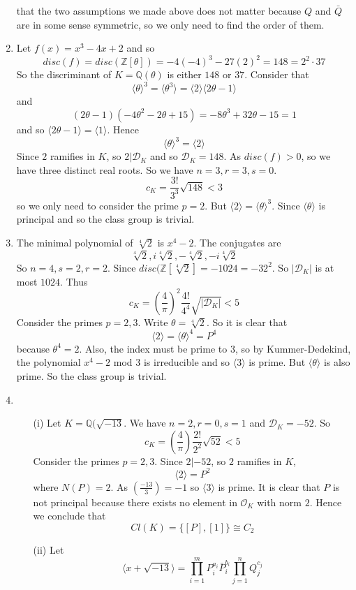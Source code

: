 \begin{enumerate}
that the two assumptions we made above does not matter because $Q$ and $\bar{Q}$ are in some sense symmetric,
so we only need to find the order of them.\\
\item Let $f(x)=x^3-4x+2$ and so
$$disc(f)=disc(\mathbb{Z}[\theta])=-4(-4)^3-27(2)^2=148=2^2\cdot 37$$
So the discriminant of $K=\mathbb{Q}(\theta)$ is either $148$ or $37$.
Consider that
$$\langle \theta \rangle^3=\langle \theta^3 \rangle=\langle 2 \rangle \langle 2\theta-1 \rangle$$
and
$$(2\theta-1)(-4\theta^2-2\theta+15)=-8\theta^3+32\theta-15=1$$
and so $\langle 2\theta-1 \rangle=\langle 1 \rangle$. Hence
$$\langle \theta \rangle^3=\langle 2 \rangle$$
Since $2$ ramifies in $K$, so $2|\mathcal{D}_K$ and so $\mathcal{D}_K=148$.
As $disc(f)>0$, so we have three distinct real roots. So we have $n=3,r=3,s=0$.
$$c_K=\frac{3!}{3^3}\sqrt{148}<3$$
so we only need to consider the prime $p=2$.
But $\langle 2 \rangle=\langle \theta \rangle^3$. Since $\langle \theta \rangle$ is principal and so the class group is trivial.\\
\item
The minimal polynomial of $\sqrt[4]{2}$ is $x^4-2$. The conjugates are
$$\sqrt[4]{2},i\sqrt[4]{2},-\sqrt[4]{2},-i\sqrt[4]{2}$$
So $n=4,s=2,r=2$. Since $disc(\mathbb{Z}[\sqrt[4]{2}]=-1024=-32^2$.
So $|\mathcal{D}_K|$ is at most $1024$. Thus
$$c_K=\left(\frac{4}{\pi}\right)^2 \frac{4!}{4^4}\sqrt{|\mathcal{D}_K|} <5$$
Consider the primes $p=2,3$. Write $\theta=\sqrt[4]{2}$. So it is clear that
$$\langle 2 \rangle=\langle \theta \rangle^4=P^4$$
because $\theta^4=2$. Also, the index must be prime to $3$, so by Kummer-Dedekind, the polynomial
$x^4-2$ mod $3$ is irreducible and so $\langle 3 \rangle$ is prime.
But $\langle \theta \rangle$ is also prime. So the class group is trivial.
\item
\begin{enumerate}
\item[(i)] Let $K=\mathbb{Q}(\sqrt{-13}$. We have $n=2,r=0,s=1$ and $\mathcal{D}_K=-52$. So
$$c_K=\left(\frac{4}{\pi}\right) \frac{2!}{2^2}\sqrt{52}<5$$
Consider the primes $p=2,3$. Since $2|-52$, so $2$ ramifies in $K$,
$$\langle 2 \rangle=P^2$$
where $N(P)=2$. As $(\frac{-13}{3})=-1$ so $\langle 3 \rangle$ is prime. It is clear that $P$ is not principal because there exists no element in $\mathcal{O}_K$ with norm $2$. Hence we conclude that
$$Cl(K)=\{[P],[1]\} \cong C_2$$
\item[(ii)] Let
$$\langle x+\sqrt{-13} \rangle=\prod_{i=1}^m P^{a_i}_i\bar{P}^{b_i}_i \prod_{j=1}^n Q^{c_j}_j$$

\end{enumerate}
\end{enumerate}
